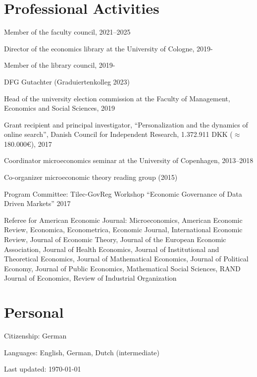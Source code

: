 \documentclass[a4paper]{article}
\def\footerlink{}
\renewenvironment{itemize}{
  \begin{list}{}{
    \setlength{\leftmargin}{1.5em}
  }
}{
  \end{list}
}
\begin{document}
\section*{Professional Activities}
\begin{itemize}
\item Member of the faculty council, 2021--2025
\item Director of the economics library at the University of Cologne, 2019-
\item Member of the library council, 2019-
\item DFG Gutachter (Graduiertenkolleg 2023)
  \item Head of the university election commission at the Faculty of Management, Economics and Social Sciences, 2019
\item Grant recipient and principal investigator, ``Personalization and the dynamics of online search'', Danish Council for Independent Research, 1.372.911 DKK ($\approx$180.000\euro), 2017
\item Coordinator microeconomics seminar at the University of Copenhagen, 2013--2018
\item Co-organizer microeconomic theory reading group (2015)
  \item Program Committee: Tilec-GovReg Workshop ``Economic Governance of Data Driven Markets'' 2017
\item Referee for American Economic Journal: Microeconomics, American Economic Review, Economica, Econometrica, Economic Journal, International Economic Review, Journal of Economic Theory, Journal of the European Economic Association, Journal of Health Economics, Journal of Institutional and Theoretical Economics, Journal of Mathematical Economics, Journal of Political Economy, Journal of Public Economics, Mathematical Social Sciences, RAND Journal of Economics, Review of Industrial Organization
\end{itemize}


\section*{Personal}

\begin{itemize}
\item Citizenship: German
\item Languages: English, German, Dutch (intermediate)
\end{itemize}


\null\vfill %
\begin{center}
  \begin{footnotesize}
    Last updated: \today \\
    \href{\footerlink}{\texttt{\footerlink}}
  \end{footnotesize}
\end{center}
\end{document}
